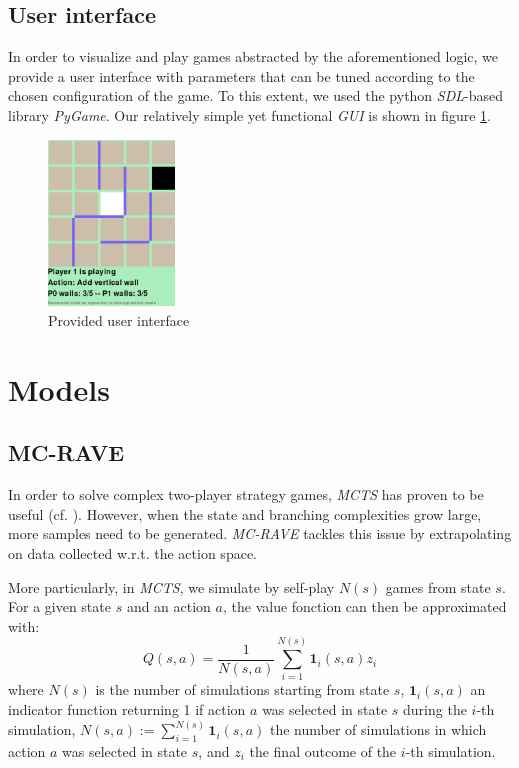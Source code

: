 \documentclass[journal, a4paper]{IEEEtran}
\begin{document}
\subsection{User interface}
In order to visualize and play games abstracted by the aforementioned logic, we provide a user interface with parameters that can be tuned according to the chosen configuration of the game. To this extent, we used the python \textit{SDL}-based library \textit{PyGame}\cite{pygame}. Our relatively simple yet functional \textit{GUI} is shown in figure \ref{fig:gui}.
\begin{figure}
    \centering
    \includegraphics[width=0.3\textwidth]{figures/gui.png}
    \caption{Provided user interface}
    \label{fig:gui}
\end{figure}


\section{Models}
\label{sec:models}

\subsection{MC-RAVE}
\label{ssec:mc-rave}
In order to solve complex two-player strategy games, \textit{MCTS} has proven to be useful (cf. \cite{mcts-review}). However, when the state and branching complexities grow large, more samples need to be generated. \textit{MC-RAVE}\cite{mc-rave} tackles this issue by extrapolating on data collected w.r.t. the action space.

More particularly, in \textit{MCTS}, we simulate by self-play $N(s)$ games from state $s$. For a given state $s$ and an action $a$, the value fonction can then be approximated with:
$$Q(s,a) = \frac{1}{N(s,a)} \sum_{i=1}^{N(s)} \mathbf{1}_{i}(s,a)z_i$$
where $N(s)$ is the number of simulations starting from state $s$, $\mathbf{1}_{i}(s,a)$ an indicator function returning 1 if action $a$ was selected in state $s$ during the $i$-th simulation, $N(s,a):=\sum_{i=1}^{N(s)} \mathbf{1}_{i}(s,a)$ the number of simulations in which action $a$ was selected in state $s$, and $z_i$ the final outcome of the $i$-th simulation.
\end{document}
